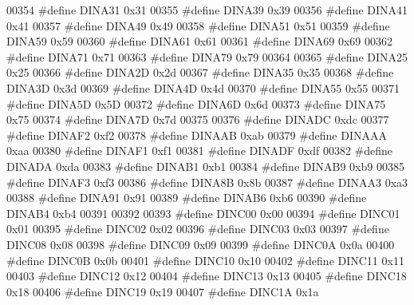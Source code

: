 \begin{DoxyCode}
00354 \textcolor{preprocessor}{#define DINA31 0x31}
00355 \textcolor{preprocessor}{#define DINA39 0x39}
00356 \textcolor{preprocessor}{#define DINA41 0x41}
00357 \textcolor{preprocessor}{#define DINA49 0x49}
00358 \textcolor{preprocessor}{#define DINA51 0x51}
00359 \textcolor{preprocessor}{#define DINA59 0x59}
00360 \textcolor{preprocessor}{#define DINA61 0x61}
00361 \textcolor{preprocessor}{#define DINA69 0x69}
00362 \textcolor{preprocessor}{#define DINA71 0x71}
00363 \textcolor{preprocessor}{#define DINA79 0x79}
00364 
00365 \textcolor{preprocessor}{#define DINA25 0x25}
00366 \textcolor{preprocessor}{#define DINA2D 0x2d}
00367 \textcolor{preprocessor}{#define DINA35 0x35}
00368 \textcolor{preprocessor}{#define DINA3D 0x3d}
00369 \textcolor{preprocessor}{#define DINA4D 0x4d}
00370 \textcolor{preprocessor}{#define DINA55 0x55}
00371 \textcolor{preprocessor}{#define DINA5D 0x5D}
00372 \textcolor{preprocessor}{#define DINA6D 0x6d}
00373 \textcolor{preprocessor}{#define DINA75 0x75}
00374 \textcolor{preprocessor}{#define DINA7D 0x7d}
00375 
00376 \textcolor{preprocessor}{#define DINADC 0xdc}
00377 \textcolor{preprocessor}{#define DINAF2 0xf2}
00378 \textcolor{preprocessor}{#define DINAAB 0xab}
00379 \textcolor{preprocessor}{#define DINAAA 0xaa}
00380 \textcolor{preprocessor}{#define DINAF1 0xf1}
00381 \textcolor{preprocessor}{#define DINADF 0xdf}
00382 \textcolor{preprocessor}{#define DINADA 0xda}
00383 \textcolor{preprocessor}{#define DINAB1 0xb1}
00384 \textcolor{preprocessor}{#define DINAB9 0xb9}
00385 \textcolor{preprocessor}{#define DINAF3 0xf3}
00386 \textcolor{preprocessor}{#define DINA8B 0x8b}
00387 \textcolor{preprocessor}{#define DINAA3 0xa3}
00388 \textcolor{preprocessor}{#define DINA91 0x91}
00389 \textcolor{preprocessor}{#define DINAB6 0xb6}
00390 \textcolor{preprocessor}{#define DINAB4 0xb4}
00391 
00392 
00393 \textcolor{preprocessor}{#define DINC00 0x00}
00394 \textcolor{preprocessor}{#define DINC01 0x01}
00395 \textcolor{preprocessor}{#define DINC02 0x02}
00396 \textcolor{preprocessor}{#define DINC03 0x03}
00397 \textcolor{preprocessor}{#define DINC08 0x08}
00398 \textcolor{preprocessor}{#define DINC09 0x09}
00399 \textcolor{preprocessor}{#define DINC0A 0x0a}
00400 \textcolor{preprocessor}{#define DINC0B 0x0b}
00401 \textcolor{preprocessor}{#define DINC10 0x10}
00402 \textcolor{preprocessor}{#define DINC11 0x11}
00403 \textcolor{preprocessor}{#define DINC12 0x12}
00404 \textcolor{preprocessor}{#define DINC13 0x13}
00405 \textcolor{preprocessor}{#define DINC18 0x18}
00406 \textcolor{preprocessor}{#define DINC19 0x19}
00407 \textcolor{preprocessor}{#define DINC1A 0x1a}

\end{DoxyCode}
